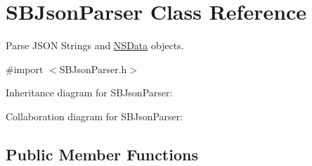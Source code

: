 \hypertarget{interface_s_b_json_parser}{
\section{\-S\-B\-Json\-Parser \-Class \-Reference}
\label{interface_s_b_json_parser}
}


\-Parse \-J\-S\-O\-N \-Strings and \hyperlink{class_n_s_data}{\-N\-S\-Data} objects.  




{\ttfamily \#import $<$\-S\-B\-Json\-Parser.\-h$>$}



\-Inheritance diagram for \-S\-B\-Json\-Parser\-:


\-Collaboration diagram for \-S\-B\-Json\-Parser\-:
\subsection*{\-Public \-Member \-Functions}
